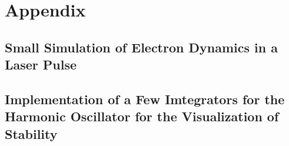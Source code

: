 \documentclass[12pt, class=report, crop=false]{standalone}
\begin{document}
\chapter*{Appendix}%

\section*{Small Simulation of Electron Dynamics in a Laser Pulse}



\newpage
\section*{Implementation of a Few Imtegrators for the Harmonic Oscillator for the Visualization of Stability}


\end{document}
